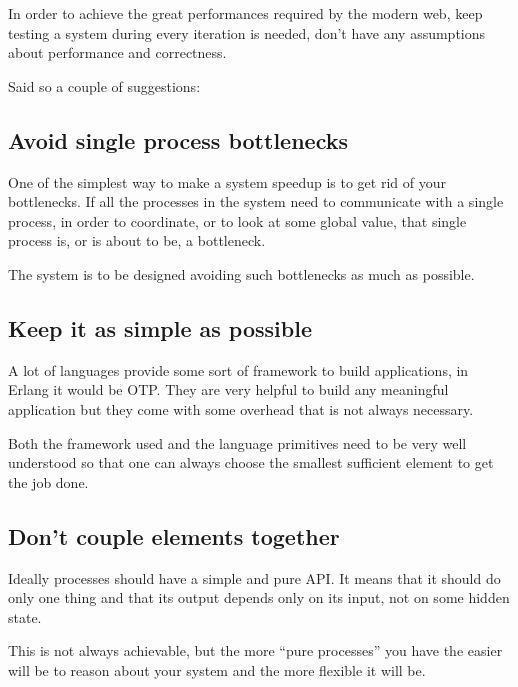 \documentclass[12pt]{article} %
\begin{document}
In order to achieve the great performances required by the modern web, keep testing a system during every iteration is needed, don't have any assumptions about performance and correctness.

Said so a couple of suggestions:

	\subsection{Avoid single process bottlenecks}
	
One of the simplest way to make a system speedup is to get rid of your bottlenecks. If all the processes in the system need to communicate with a single process, in order to coordinate, or to look at some global value, that single process is, or is about to be, a bottleneck.

The system is to be designed avoiding such bottlenecks as much as possible.	

	\subsection{Keep it as simple as possible}

A lot of languages provide some sort of framework to build applications, in Erlang it would be OTP. They are very helpful to build any meaningful application but they come with some overhead that is not always necessary.

Both the framework used and the language primitives need to be very well understood so that one can always choose the smallest sufficient element to get the job done.

	\subsection{Don't couple elements together}

Ideally processes should have a simple and pure API. It means that it should do only one thing and that its output depends only on its input, not on some hidden state.

This is not always achievable, but the more ``pure processes'' you have the easier will be to reason about your system and the more flexible it will be.
\end{document}
